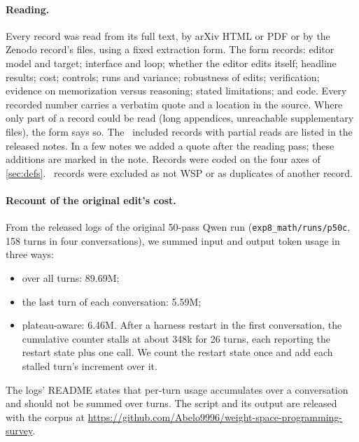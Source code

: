 \paragraph{Reading.} Every record was read from its full text, by arXiv HTML or PDF or by the Zenodo record's files, using a fixed extraction form. The form records: editor model and target; interface and loop; whether the editor edits itself; headline results; cost; controls; runs and variance; robustness of edits; verification; evidence on memorization versus reasoning; stated limitations; and code. Every recorded number carries a verbatim quote and a location in the source. Where only part of a record could be read (long appendices, unreachable supplementary files), the form says so. The \nPartial\ included records with partial reads are listed in the released notes. In a few notes we added a quote after the reading pass; these additions are marked in the note. Records were coded on the four axes of \cref{sec:defs}. \nExcluded\ records were excluded as not WSP or as duplicates of another record.

\paragraph{Recount of the original edit's cost.} From the released logs of the original 50-pass Qwen run (\texttt{exp8\_math/runs/p50c}, 158 turns in four conversations), we summed input and output token usage in three ways:
\begin{itemize}[leftmargin=*,itemsep=1pt]
\item over all turns: 89.69M;
\item the last turn of each conversation: 5.59M;
\item plateau-aware: 6.46M. After a harness restart in the first conversation, the cumulative counter stalls at about 348k for 26 turns, each reporting the restart state plus one call. We count the restart state once and add each stalled turn's increment over it.
\end{itemize}
The logs' README states that per-turn usage accumulates over a conversation and should not be summed over turns. The script and its output are released with the corpus at \url{https://github.com/Abelo9996/weight-space-programming-survey}.

